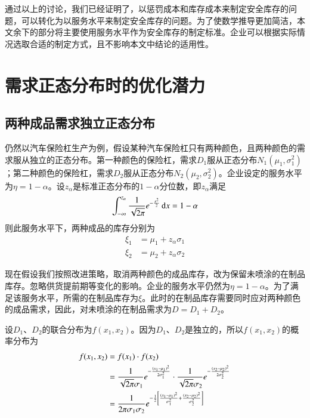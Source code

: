 通过以上的讨论，我们已经证明了，以惩罚成本和库存成本来制定安全库存的问题，可以转化为以服务水平来制定安全库存的问题。为了使数学推导更加简洁，本文余下的部分将主要使用服务水平作为安全库存的制定标准。企业可以根据实际情况选取合适的制定方式，且不影响本文中结论的适用性。












\section{需求正态分布时的优化潜力}

\subsection{两种成品需求独立正态分布}

仍然以汽车保险杠生产为例，假设某种汽车保险杠只有两种颜色，且两种颜色的需求服从独立的正态分布。第一种颜色的保险杠，需求$D_1$服从正态分布$N_1(\mu_1,\sigma_1^2)$；第二种颜色的保险杠，需求$D_2$服从正态分布$N_2(\mu_2,\sigma_2^2)$。企业设定的服务水平为$\eta=1-\alpha$。设$z_\alpha$是标准正态分布的$1-\alpha$分位数，即$z_\alpha$满足
\[
\int_{-\infty}^{z_\alpha}\frac{1}{\sqrt{2\pi}}e^{-\frac{x^2}{2}}\operatorname{d\!} x = 1-\alpha
\]
则此服务水平下，两种成品的库存分别为
\begin{align}
\xi_1 &= \mu_1 + z_\alpha\sigma_1 \label{eq:成品库存1}\\
\xi_2 &= \mu_2 + z_\alpha\sigma_2 \label{eq:成品库存2}
\end{align}

现在假设我们按照改进策略，取消两种颜色的成品库存，改为保留未喷涂的在制品库存。忽略供货提前期等变化的影响。企业的服务水平仍然为$\eta=1-\alpha$。为了满足该服务水平，所需的在制品库存为$\xi$。此时的在制品库存需要同时应对两种颜色的成品需求，因此，对未喷涂的在制品需求为$D=D_1+D_2$。

设$D_1$、$D_2$的联合分布为$f(x_1,x_2)$。因为$D_1$、$D_2$是独立的，所以$f(x_1,x_2)$的概率分布为
\begin{align}
f(x_1,x_2) &= f(x_1)\cdot f(x_2) \notag\\
&= \frac{1}{\sqrt{2\pi}\sigma_1}e^{-\frac{(x_1-\mu_1)^2}{2\sigma_1^2}}\cdot \frac{1}{\sqrt{2\pi}\sigma_2}e^{-\frac{(x_2-\mu_2)^2}{2\sigma_2^2}} \notag\\
&= \frac{1}{2\pi\sigma_1\sigma_2}e^{-\frac{1}{2}\left[\frac{(x_1-\mu_1)^2}{\sigma_1^2}+\frac{(x_2-\mu_2)^2}{\sigma_2^2}\right]}
\label{eq:联合分布}
\end{align}

